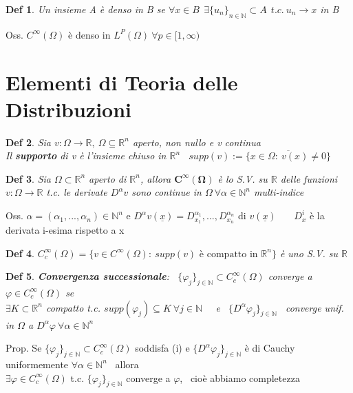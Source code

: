 \documentclass{article}
\theoremstyle{unnumbered}
\newtheorem* {theoremT}{Def}
\theoremstyle{unnumbered1}
\newenvironment{defi}{\begin{gBox}\begin{theoremT}}{\end{theoremT}\end{gBox}}
\renewcommand{\phi}{\varphi}
\begin{document}
\begin{defi}
Un insieme A è denso in B se $\forall x \in B \ \ \exists \{u_n\}_{n\in\mathbb{N}}\subset A \ \ t.c. \ u_n\to x$ in B
\end{defi}
Oss. $C^{\infty}(\Omega)$ è denso in $L^P(\Omega) \ \forall p\in [1,\infty) $
\newpage




\section{Elementi di Teoria delle Distribuzioni}

\begin{defi}
Sia $v:\Omega\to\mathbb{R},\ \Omega\subseteq\mathbb{R}^n$ aperto, non nullo e v continua\\
Il \textbf{supporto} di v è l'insieme chiuso in $\mathbb{R}^n$ \ $supp(v):=\overline{\{x\in\Omega : \ v(x)\neq 0\}}$
\end{defi}



\begin{defi}
Sia $\Omega\subset\mathbb{R}^n$ aperto di $\mathbb{R}^n$, allora $\mathbf{C^{\infty}(\Omega)}$ è lo S.V. su $\mathbb{R}$ delle funzioni $v:\Omega\to\mathbb{R}$ t.c. le derivate $D^{\alpha}v$ sono continue in $\Omega \ \forall \alpha\in\mathbb{N}^n$ multi-indice 
\end{defi}
%
Oss. $\alpha=(\alpha_1,...,\alpha_n)\in\mathbb{N}^n$ e $D^{\alpha}v(\underline{x})=D^{\alpha_1}_{x_1},...,D^{\alpha_n}_{x_n}$ di $v(\underline{x})$ \ \ \ $D^i_x$ è la derivata i-esima rispetto a x\\


\begin{defi}
$C^{\infty}_c(\Omega)=\{v\in C^{\infty}(\Omega) : \ supp(v) \text{ è compatto in } \mathbb{R}^n\}$ è uno S.V. su $\mathbb{R}$
\end{defi}

\begin{defi}
\textbf{Convergenza successionale}: \ $\{\varphi_j\}_{j\in\mathbb{N}}\subset C_c^{\infty}(\Omega)$ converge a $\varphi\in C_c^{\infty}(\Omega)$ se\\
$\exists K \subset\mathbb{R}^n$ compatto t.c. $supp(\varphi_j)\subseteq K \ \forall j \in \mathbb{N}$ \ \ e \ $\{D^{\alpha}\varphi_j\}_{j\in\mathbb{N}}$ \ converge unif. in $\Omega$ a $D^{\alpha}\varphi \ \forall\alpha\in\mathbb{N}^n$
\end{defi}
%
Prop. Se $\{\varphi_j\}_{j\in\mathbb{N}}\subset C_c^{\infty}(\Omega)$ soddisfa (i) e $\{D^{\alpha}\varphi_j\}_{j\in\mathbb{N}}$ è di Cauchy uniformemente $\forall\alpha\in\mathbb{N}^n$ \ allora \\
$\exists \phi\in C^{\infty}_c(\Omega)$ t.c. $\{\phi_j\}_{j\in\mathbb{N}}$ converge a $\phi$, \ cioè abbiamo completezza
\end{document}
